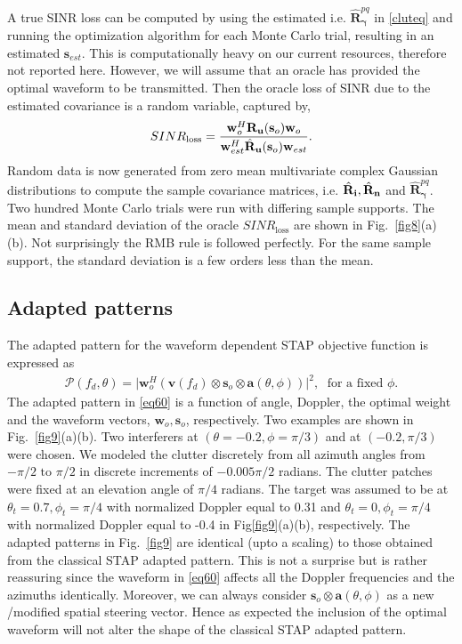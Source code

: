 \documentclass[11pt,draftclsnofoot,onecolumn]{IEEEtran}
\theoremstyle{definition}
\theoremstyle{remark}
\begin{document}
A true SINR loss can be computed  by using the estimated i.e. $\hat{\mathbf{R}}_{\boldsymbol{\gamma}}^{pq}$  in \eqref{cluteq}  and running the optimization algorithm for each Monte Carlo trial, resulting in an estimated $\mathbf{s}_{est}$. This is computationally heavy  on our current resources, therefore not reported here.
However, we will assume that an oracle has provided the optimal waveform to be transmitted. Then the oracle loss of SINR due to the estimated covariance  is a  random variable, captured by,
\begin{align*}
SINR_{\mathrm{loss}}=\frac{\mathbf{w}^H_{o}\mathbf{R_u}(\mathbf{s}_{o})\mathbf{w}_{o}}{\mathbf{w}^H_{est}\hat{\mathbf{R}}_{\bf u}(\mathbf{s}_{o})\mathbf{w}_{est}} .
\end{align*}
Random data is now generated from zero mean multivariate complex Gaussian distributions to compute the sample covariance matrices, i.e. $\hat{\mathbf{R}}_{\bf i}, \hat{\mathbf{R}}_{\bf n}$ and $\hat{\mathbf{R}}_{\boldsymbol{\gamma}}^{pq}$. Two hundred Monte Carlo trials were run with differing sample supports. The mean and standard deviation of the oracle  $SINR_{\mathrm{loss}}$ are shown in Fig.~\ref{fig8}(a)(b). Not surprisingly the RMB rule is followed perfectly. For the same sample support, the standard deviation is  a few orders less than the mean. 
\subsection{Adapted patterns}
The adapted pattern for the waveform dependent STAP objective function is expressed as
\begin{align}
\mathcal{P}(f_d,\theta)=\lvert\mathbf{w}_o^H ( \mathbf{v}(f_d)\otimes\mathbf{s}_o \otimes \mathbf{a}(\theta,\phi) ) \rvert^2,\;\mbox{ for a fixed }\phi. 
\label{eq60}
\end{align}
The adapted pattern in \eqref{eq60} is a function of angle, Doppler, the optimal weight and the waveform vectors, $\mathbf{w}_o,\mathbf{s}_o$, respectively. Two examples are shown in Fig.~\ref{fig9}(a)(b). Two interferers at $(\theta=-0.2,\phi=\pi/3)$ and at $(-0.2,\pi/3)$ were chosen. We modeled the clutter discretely from all azimuth angles from $-\pi/2\mbox{ to } \pi/2$ in discrete increments of $-0.005\pi/2$ radians. The clutter patches were fixed at an elevation angle of $\pi/4$ radians. The target was assumed to be at $\theta_t=0.7,\phi_t=\pi/4$ with normalized Doppler equal to 0.31 and $\theta_t=0,\phi_t=\pi/4$ with normalized Doppler equal to -0.4 in Fig\ref{fig9}(a)(b), respectively.  The adapted patterns in Fig.~\ref{fig9} are identical (upto a scaling) to those obtained from the classical STAP adapted pattern. This is not a surprise but is rather reassuring since the waveform in \eqref{eq60} affects all the Doppler frequencies and the azimuths identically. Moreover, we can always consider $\mathbf{s}_o \otimes \mathbf{a}(\theta,\phi)$ as a new /modified spatial steering vector. Hence as expected the inclusion of the optimal waveform will not alter the shape of the classical STAP adapted pattern.
\end{document}
